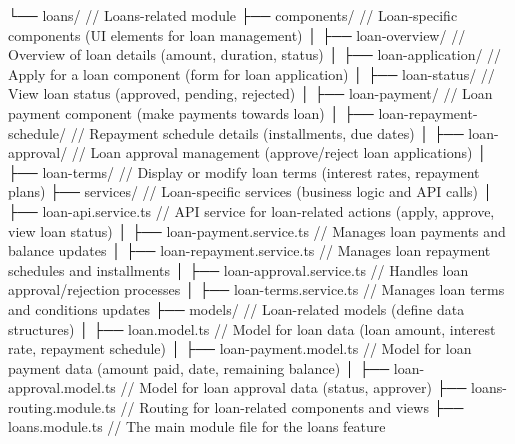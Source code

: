         └── loans/                              // Loans-related module
            ├── components/                      // Loan-specific components (UI elements for loan management)
            │   ├── loan-overview/               // Overview of loan details (amount, duration, status)
            │   ├── loan-application/            // Apply for a loan component (form for loan application)
            │   ├── loan-status/                 // View loan status (approved, pending, rejected)
            │   ├── loan-payment/                // Loan payment component (make payments towards loan)
            │   ├── loan-repayment-schedule/     // Repayment schedule details (installments, due dates)
            │   ├── loan-approval/               // Loan approval management (approve/reject loan applications)
            │   ├── loan-terms/                  // Display or modify loan terms (interest rates, repayment plans)
            ├── services/                        // Loan-specific services (business logic and API calls)
            │   ├── loan-api.service.ts          // API service for loan-related actions (apply, approve, view loan status)
            │   ├── loan-payment.service.ts      // Manages loan payments and balance updates
            │   ├── loan-repayment.service.ts    // Manages loan repayment schedules and installments
            │   ├── loan-approval.service.ts     // Handles loan approval/rejection processes
            │   ├── loan-terms.service.ts        // Manages loan terms and conditions updates
            ├── models/                          // Loan-related models (define data structures)
            │   ├── loan.model.ts                // Model for loan data (loan amount, interest rate, repayment schedule)
            │   ├── loan-payment.model.ts        // Model for loan payment data (amount paid, date, remaining balance)
            │   ├── loan-approval.model.ts       // Model for loan approval data (status, approver)
            ├── loans-routing.module.ts          // Routing for loan-related components and views
            ├── loans.module.ts                  // The main module file for the loans feature


